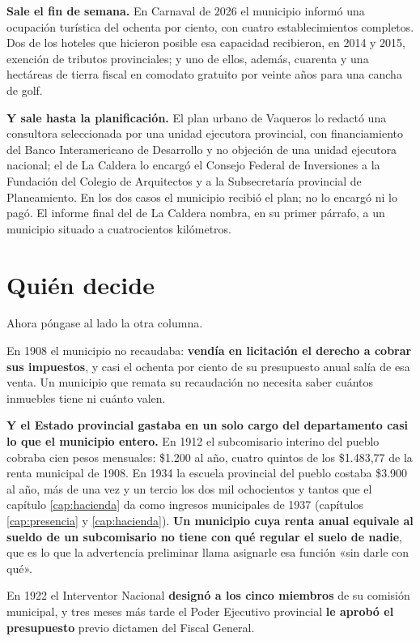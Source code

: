\textbf{Sale el fin de semana.} En Carnaval de 2026 el municipio informó una ocupación
turística del ochenta por ciento, con cuatro establecimientos completos. Dos de los hoteles
que hicieron posible esa capacidad recibieron, en 2014 y 2015, exención de tributos
provinciales; y uno de ellos, además, cuarenta y una hectáreas de tierra fiscal en comodato
gratuito por veinte años para una cancha de golf.

\textbf{Y sale hasta la planificación.} El plan urbano de Vaqueros lo redactó una consultora seleccionada por una unidad ejecutora provincial, con financiamiento del Banco Interamericano de Desarrollo y no objeción de una unidad ejecutora nacional; el de La Caldera lo encargó el Consejo Federal de Inversiones a la Fundación del Colegio de Arquitectos y a la Subsecretaría provincial de Planeamiento. En los dos casos el municipio recibió el plan; no lo encargó ni lo pagó. El informe final del de
La Caldera nombra, en su primer párrafo, a un municipio situado a cuatrocientos kilómetros.

\section{Quién decide}

Ahora póngase al lado la otra columna.

En 1908 el municipio no recaudaba: \textbf{vendía en licitación el derecho a cobrar sus
impuestos}, y casi el ochenta por ciento de su presupuesto anual salía de esa venta. Un municipio
que remata su recaudación no necesita saber cuántos inmuebles tiene ni cuánto valen.

\textbf{Y el Estado provincial gastaba en un solo cargo del departamento casi lo que el
municipio entero.} En 1912 el subcomisario interino del pueblo cobraba cien pesos mensuales:
\$1.200 al año, cuatro quintos de los \$1.483,77 de la renta municipal de 1908. En 1934 la
escuela provincial del pueblo costaba \$3.900 al año, más de una vez y un tercio los dos mil
ochocientos y tantos que el capítulo \ref{cap:hacienda} da como ingresos municipales de 1937
(capítulos \ref{cap:presencia} y \ref{cap:hacienda}). \textbf{Un municipio cuya renta anual
equivale al sueldo de un subcomisario no tiene con qué regular el suelo de nadie}, que es lo que
la advertencia preliminar llama asignarle esa función «sin darle con qué».

En 1922 el Interventor Nacional \textbf{designó a los cinco miembros} de su comisión
municipal, y tres meses más tarde el Poder Ejecutivo provincial \textbf{le aprobó el
presupuesto} previo dictamen del Fiscal General.

